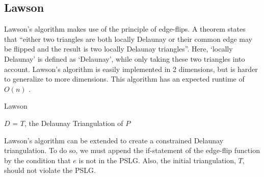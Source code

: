 \subsection{Lawson}
\label{sub:lawson}
Lawson's algorithm makes use of the principle of edge-flips.
A theorem states that ``either two triangles are both locally Delaunay or their common edge may be flipped
and the result is two locally Delaunay triangles''.
Here, `locally Delaunay' is defined as `Delaunay', while only taking these two triangles into account.
Lawson's algorithm is easily implemented in 2 dimensions, but is harder to generalize to more dimensions.
This algorithm has an expected runtime of $O(n)$ \cite{shewchuk}.

\begin{algorithm}
    \caption{Lawson}
    \begin{algorithmic}
            \EndFor
            \Return $D$ = $T$, the Delaunay Triangulation of $P$
        \EndFunction
            \EndIf
        \EndFunction
    \end{algorithmic}
\end{algorithm}

Lawson's algorithm can be extended to create a constrained Delaunay triangulation.
To do so, we must append the if-statement of the edge-flip function by the condition that $e$ is not in the PSLG.
Also, the initial triangulation, $T$, should not violate the PSLG.



